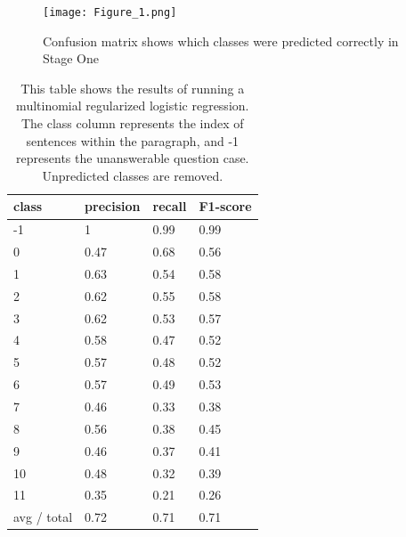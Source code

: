 \begin{figure}
  \texttt{[image: Figure\_1.png]}\centering
  \caption{Confusion matrix shows which classes were predicted correctly in Stage One}
  \label{arc_stg1}
\end{figure}

\begin{table}
\centering
\caption{This table shows the results of running a multinomial regularized logistic regression. The class column represents the index of sentences within the paragraph, and -1 represents the unanswerable question case. Unpredicted classes are removed.}
\label{mlr-stage1}
\begin{tabular}{|l|l|l|l|} 
\hline
 \textbf{class}  & \textbf{precision}  & \textbf{recall}  & \textbf{F1-score}   \\ 
\hline
-1               & 1                   & 0.99             & 0.99                \\ 
\hline
0                & 0.47                & 0.68             & 0.56                \\ 
\hline
1                & 0.63                & 0.54             & 0.58                \\ 
\hline
2                & 0.62                & 0.55             & 0.58                \\ 
\hline
3                & 0.62                & 0.53             & 0.57                \\ 
\hline
4                & 0.58                & 0.47             & 0.52                \\ 
\hline
5                & 0.57                & 0.48             & 0.52                \\ 
\hline
6                & 0.57                & 0.49             & 0.53                \\ 
\cline{1-3}
7                & 0.46                & 0.33             & 0.38                \\ 
\hline
8                & 0.56                & 0.38             & 0.45                \\ 
\hline
9                & 0.46                & 0.37             & 0.41                \\ 
\hline
10               & 0.48                & 0.32             & 0.39                \\ 
\hline
11               & 0.35                & 0.21             & 0.26                \\ 
\hline
avg / total      & 0.72                & 0.71             & 0.71                \\
\hline
\end{tabular}
\label{tb:stg1_lr}
\end{table}

